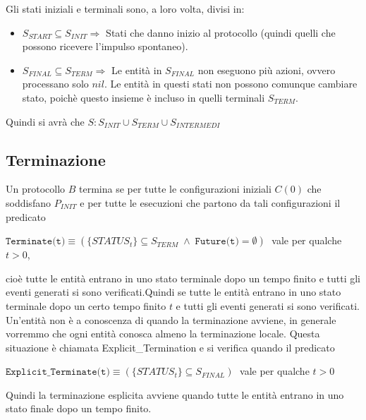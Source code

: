 Gli stati iniziali e terminali sono, a loro volta, divisi in:
\begin{itemize}
    \item $S_{START}\subseteq S_{INIT} \Rightarrow$ Stati che danno inizio al
          protocollo (quindi quelli che possono ricevere l'impulso spontaneo).
    \item $S_{FINAL}\subseteq S_{TERM} \Rightarrow$ Le entità in $S_{FINAL}$ non
          eseguono più azioni, ovvero processano solo $nil$. Le entità in questi stati
          non possono comunque cambiare stato, poichè questo insieme è incluso in quelli
          terminali $S_{TERM}$.
\end{itemize}

Quindi si avrà che $S: S_{INIT} \cup S_{TERM} \cup S_{INTERMEDI}$

\subsection{Terminazione}
Un protocollo $B$ termina se per tutte le configurazioni iniziali $C(0)$ che
soddisfano $P_{INIT}$ e per tutte le esecuzioni che partono da tali
configurazioni il predicato
\begin{center}
    $\texttt{Terminate(t)} \equiv (\{STATUS_t\} \subseteq S_{TERM} \; \wedge \;
        \texttt{Future(t)} = \emptyset) \;$ vale per qualche \; $t>0$,
\end{center}
cioè tutte le entità entrano in uno stato terminale dopo un tempo finito e tutti
gli eventi generati si sono verificati.Quindi se tutte le entità entrano in uno
stato terminale dopo un certo tempo finito $t$ e tutti gli eventi generati si
sono verificati.\\
Un'entità non è a conoscenza di quando la terminazione avviene, in generale
vorremmo che ogni entità conosca almeno la terminazione locale. Questa
situazione è chiamata Explicit\_Termination e si verifica quando il predicato

\begin{center}
    $\texttt{Explicit\_Terminate(t)} \equiv (\{STATUS_t\} \subseteq S_{FINAL}) \;$
    vale per qualche $t>0$
\end{center}
Quindi la terminazione esplicita avviene quando tutte le entità entrano in uno
stato finale dopo un tempo finito.


